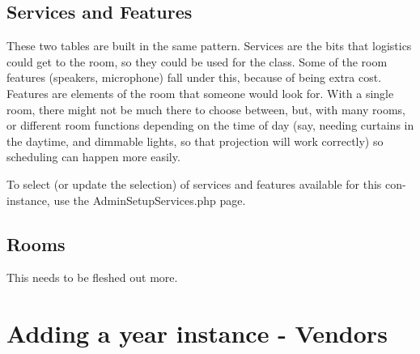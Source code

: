 \documentclass[captions=tablesignature]{scrartcl}
\begin{document}
\subsection{Services and Features}
\label{sec-12-2}
These two tables are built in the same pattern.  Services are the
bits that logistics could get to the room, so they could be used
for the class.  Some of the room features (speakers, microphone)
fall under this, because of being extra cost.  Features are
elements of the room that someone would look for.  With a single
room, there might not be much there to choose between, but, with
many rooms, or different room functions depending on the time of
day (say, needing curtains in the daytime, and dimmable lights, so
that projection will work correctly) so scheduling can happen more
easily.

To select (or update the selection) of services and features
available for this con-instance, use the AdminSetupServices.php
page.
\subsection{Rooms}
\label{sec-12-3}
This needs to be fleshed out more.

\section{Adding a year instance - Vendors}
\label{sec-13}
\end{document}
